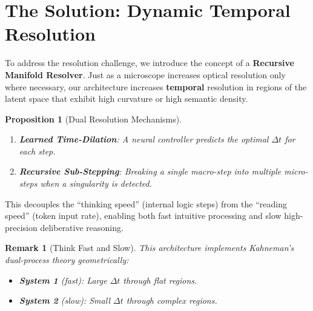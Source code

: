 \documentclass[12pt,letterpaper,twoside]{article}
\newtheorem{remarque}{Remark}[section]
\newtheorem{prop}{Proposition}[section]
\begin{document}
\section{The Solution: Dynamic Temporal Resolution}

To address the resolution challenge, we introduce the concept of a \textbf{Recursive Manifold Resolver}. Just as a microscope increases optical resolution only where necessary, our architecture increases \textbf{temporal} resolution in regions of the latent space that exhibit high curvature or high semantic density.

\begin{prop}[Dual Resolution Mechanisms]
\begin{enumerate}
\item \textbf{Learned Time-Dilation}: A neural controller predicts the optimal $\Delta t$ for each step.
\item \textbf{Recursive Sub-Stepping}: Breaking a single macro-step into multiple micro-steps when a singularity is detected.
\end{enumerate}
\end{prop}

This decouples the ``thinking speed'' (internal logic steps) from the ``reading speed'' (token input rate), enabling both fast intuitive processing and slow high-precision deliberative reasoning.

\begin{remarque}[Think Fast and Slow]
This architecture implements Kahneman's dual-process theory geometrically:
\begin{itemize}
\item \textbf{System 1} (fast): Large $\Delta t$ through flat regions.
\item \textbf{System 2} (slow): Small $\Delta t$ through complex regions.
\end{itemize}
\end{remarque}
\end{document}
